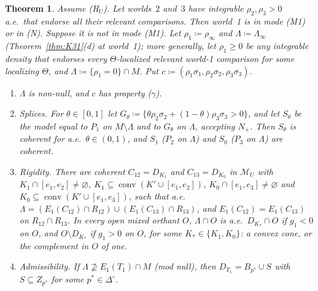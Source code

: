 \documentclass[11pt]{article}
\newtheorem{theorem}{Theorem}[section]
\theoremstyle{definition}
\theoremstyle{remark}
\newcommand{\Di}{\Delta^{\circ}}
\newcommand{\M}{\mathcal M}
\newcommand{\co}{\operatorname{conv}}
\begin{document}
\begin{theorem}\label{thm:K37}
Assume (H$_U$). Let worlds~$2$ and~$3$ have integrable $\rho_2,\rho_3>0$ a.e.\ that endorse all their relevant comparisons. Then world~1 is in mode (M1) or in (N). Suppose it is not in mode (M1). Let $\rho_1\coloneqq\rho_\infty$ and $\Lambda\coloneqq\Lambda_\infty$ (Theorem~\ref{thm:K31}(d) at world~1); more generally, let $\rho_1\ge0$ be any integrable density that endorses every $\Theta$-localized relevant world-1 comparison for some localizing $\Theta$, and $\Lambda\coloneqq\{\rho_1=0\}\cap M$. Put $c\coloneqq(\rho_1\sigma_1,\rho_2\sigma_2,\rho_3\sigma_3)$.
\begin{enumerate}[leftmargin=*,label=(\alph*)]
\item $\Lambda$ is non-null, and $c$ has property ($\gamma$).
\item \emph{Splices.} For $\theta\in[0,1]$ let $G_\theta\coloneqq\{\theta\rho_2\sigma_2+(1-\theta)\rho_3\sigma_3>0\}$, and let $S_\theta$ be the model equal to $P_1$ on $M\setminus\Lambda$ and to $G_\theta$ on $\Lambda$, accepting $N_+$. Then $S_\theta$ is coherent for a.e.\ $\theta\in(0,1)$, and $S_1$ ($P_2$ on $\Lambda$) and $S_0$ ($P_3$ on $\Lambda$) are coherent.
\item[(b$'$)] \emph{Rigidity.} There are coherent $C_{12}=D_{K_1}$ and $C_{13}=D_{K_0}$ in $\M_U$ with $K_1\cap[e_1,e_2]\ne\varnothing$, $K_1\subseteq\co(K'\cup[e_1,e_2])$, $K_0\cap[e_1,e_3]\ne\varnothing$ and $K_0\subseteq\co(K'\cup[e_1,e_3])$, such that a.e.\ $\Lambda=(E_1(C_{12})\cap R_{12})\cup(E_1(C_{13})\cap R_{13})$, and $E_1(C_{12})=E_1(C_{13})$ on $R_{12}\cap R_{13}$. In every open mixed orthant $O$, $\Lambda\cap O$ is a.e.\ $D_{K_*}\cap O$ if $g_1<0$ on $O$, and $O\setminus D_{K_*}$ if $g_1>0$ on $O$, for some $K_*\in\{K_1,K_0\}$: a convex cone, or the complement in $O$ of one.
\item[(c)] \emph{Admissibility.} If $\Lambda\not\supseteq E_1(T_1)\cap M$ (mod null), then $D_{T_1}=B_{p^*}\cup S$ with $S\subseteq Z_{p^*}$ for some $p^*\in\Di$.
\end{enumerate}
\end{theorem}
\end{document}
